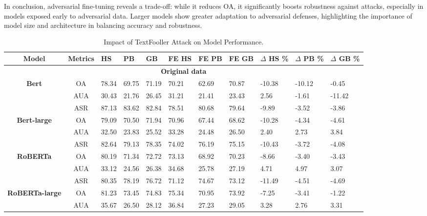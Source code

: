 \documentclass{article}
\begin{document}
In conclusion, adversarial fine-tuning reveals a trade-off: while it reduces OA, it significantly boosts robustness against attacks, especially in models exposed early to adversarial data. Larger models show greater adaptation to adversarial defenses, highlighting the importance of model size and architecture in balancing accuracy and robustness.



\begin{table}[ht]
\caption{Impact of TextFooller Attack on Model Performance.}
\scriptsize
\centering
\begin{tabular}{c|c|p{0.6cm}p{0.6cm}p{0.6cm}|p{1cm}p{1cm}p{1cm}|p{1cm}p{1cm}p{1cm}}
\hline
\textbf{Model} & \textbf{Metrics} & {HS} & {PB} & {GB} & {FE HS} & {FE PB} & {FE GB} & $\Delta$ HS \% & $\Delta$ PB \% & $\Delta$ GB \% \\ \hline
\multicolumn{11}{c}{\textbf{Original data}} \\ \hline
\multirow{3}{*}{\textbf{Bert}} & OA   & 78.34  & 69.75 & 71.19 & 70.21 & 62.69 & 70.87 & -10.38 & -10.12 & -0.45 \\ 
                                    & AUA  & 30.43  & 21.76  & 26.45  & 31.21   & 21.41  & 23.43  & 2.56  & -1.61  & -11.42 \\ 
                                    & ASR  & 87.13 & 83.62 & 82.84 & 78.51  & 80.68 & 79.64 & -9.89 & -3.52  & -3.86 \\ \hline
\multirow{3}{*}{\textbf{Bert-large}} & OA   & 79.09 & 70.50 & 71.94 & 70.96 & 67.44 & 68.62 & -10.28 & -4.34 & -4.61 \\
                                      & AUA  & 32.50 & 23.83 & 25.52 & 33.28 & 24.48 & 26.50 & 2.40   & 2.73  & 3.84  \\
                                      & ASR  & 82.64 & 79.13 & 78.35 & 74.02 & 76.19 & 75.15 & -10.43 & -3.72 & -4.08 \\ \hline
\multirow{3}{*}{\textbf{RoBERTa}} & OA & 80.19 & 71.34 & 72.72 & 73.13 & 68.92 & 70.23 & -8.66 & -3.40 & -3.43 \\ 
& AUA & 33.12 & 24.56 & 26.38 & 34.68 & 25.78 & 27.19 & 4.71 & 4.97 & 3.07 \\ 
& ASR & 80.35 & 78.19 & 76.72 & 71.12 & 74.67 & 73.12 & -11.49 & -4.51 & -4.69 \\ \hline
\multirow{3}{*}{\textbf{RoBERTa-large}} & OA & 81.23 & 73.45 & 74.83 & 75.34 & 70.95 & 73.92 & -7.25 & -3.41 & -1.22 \\ 
& AUA & 35.67 & 26.50 & 28.12 & 36.84 & 27.23 & 29.05 & 3.28 & 2.76 & 3.31 \\ 

\end{tabular}
\end{table}
\end{document}
